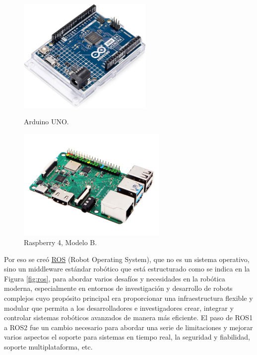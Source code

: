 \begin{figure}[h!]
  \begin{minipage}{0.48\textwidth}
    \centering
    \includegraphics[width=6.5cm]{figs/arduino_uno.jpg}
    \caption{Arduino UNO.}
    \label{fig:arduino}
  \end{minipage}
  \hfill
  \begin{minipage}{0.48\textwidth}
    \centering
    \includegraphics[width=7.2cm]{figs/raspberry4.png}
    \caption{Raspberry 4, Modelo B.} 
    \label{fig:raspberry}
  \end{minipage}
\end{figure}

Por eso se creó \hyperlink{ROS}{ROS} (Robot Operating System), que no es un sistema operativo, sino un middleware estándar robótico que está estructurado como se indica en la Figura \ref{fig:ros}, para abordar varios desafíos y necesidades en la robótica moderna, especialmente en entornos de investigación y desarrollo de robots complejos cuyo propósito principal era proporcionar una infraestructura flexible y modular que permita a los desarrolladores e investigadores crear, integrar y controlar sistemas robóticos avanzados de manera más eficiente. El paso de ROS1 a ROS2 fue un cambio necesario para abordar una serie de limitaciones y mejorar varios aspectos el soporte para sistemas en tiempo real, la seguridad y fiabilidad, soporte multiplataforma, etc.


